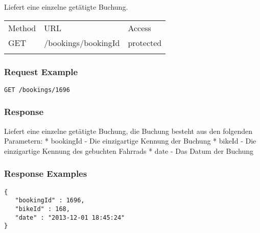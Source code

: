 Liefert eine einzelne getätigte Buchung.

\begin{longtable}[c]{@{}lll@{}}
\toprule\addlinespace
Method & URL & Access
\\\addlinespace
\midrule\endhead
GET & /bookings/bookingId & protected
\\\addlinespace
\bottomrule
\end{longtable}

\subsubsection{Request Example}\label{request-example}

\begin{verbatim}
GET /bookings/1696
\end{verbatim}

\subsubsection{Response}\label{response}

Liefert eine einzelne getätigte Buchung, die Buchung besteht aus den
folgenden Parametern: * bookingId - Die einzigartige Kennung der Buchung
* bikeId - Die einzigartige Kennung des gebuchten Fahrrads * date - Das
Datum der Buchung

\subsubsection{Response Examples}\label{response-examples}

\begin{verbatim}
{
   "bookingId" : 1696,
   "bikeId" : 168,
   "date" : "2013-12-01 18:45:24"
}
\end{verbatim}
